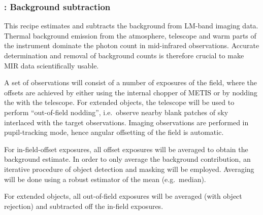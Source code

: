 \clearpage
\subsubsection{: Background subtraction}
\label{lm_img_background}
\label{rec:lm_img_background}
\label{sssec:lm_img_background}
\label{metis_lm_img_background}
\label{rec:metis_lm_img_background}
\label{sssec:metis_lm_img_background}

This recipe estimates and subtracts the background from LM-band
imaging data. Thermal background emission from the atmosphere,
telescope and warm parts of the instrument dominate the photon count
in mid-infrared observations. Accurate determination and removal of
background counts is therefore crucial to make MIR data scientifically
usable.

A set of observations will consist of a number of exposures
of the field, where the offsets are achieved by either using the internal
chopper of METIS or by nodding the with the telescope. For extended objects, the
telescope will be used to perform ``out-of-field nodding'', i.e.\
observe nearby blank patches of sky interlaced with the target
observations. Imaging observations are performed in pupil-tracking
mode, hence angular offsetting of the field is automatic.

For in-field-offset exposures, all offset exposures will be
averaged to obtain the background estimate. In order to only average
the background contribution, an iterative procedure of object
detection and masking will be employed. Averaging will be done using a
robust estimator of the mean (e.g.\ median).

For extended objects, all out-of-field exposures will be averaged
(with object rejection) and subtracted off the in-field exposures.

%

